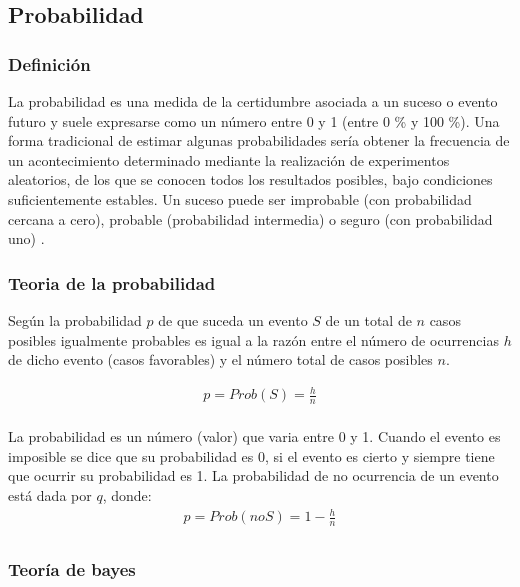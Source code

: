 \subsection{Probabilidad}

\subsubsection{Definición}

La probabilidad es una medida de la certidumbre asociada a un suceso o evento futuro y suele expresarse como un número entre 0 y 1 (entre 0 \% y 100 \%). 
\vskip 0.1cm 
Una forma tradicional de estimar algunas probabilidades sería obtener la frecuencia de un acontecimiento determinado mediante la realización de experimentos aleatorios, de los que se conocen todos los resultados posibles, bajo condiciones suficientemente estables. Un suceso puede ser improbable (con probabilidad cercana a cero), probable (probabilidad intermedia) o seguro (con probabilidad uno) \citep{loeve}.

\subsubsection{Teoria de la probabilidad}

Según \citep{alvarez_rojas} la probabilidad \(p\) de que suceda un evento \(S\) de un total de \(n\) casos posibles igualmente probables es igual a la razón entre el número de ocurrencias \(h\) de dicho evento (casos favorables) y el número total de casos posibles \(n\).

\begin{align*}
p = Prob(S) = \frac{h}{n}\\
\end{align*}

La probabilidad es un número (valor) que varia entre 0 y 1. Cuando el evento es imposible se dice que su probabilidad es 0, si el evento es cierto y siempre tiene que ocurrir su probabilidad es 1.
La probabilidad de no ocurrencia de un evento está dada por \(q\), donde:
\begin{align*}
p = Prob(noS) = 1 - \frac{h}{n}\\
\end{align*}


\subsubsection{Teoría de bayes}

